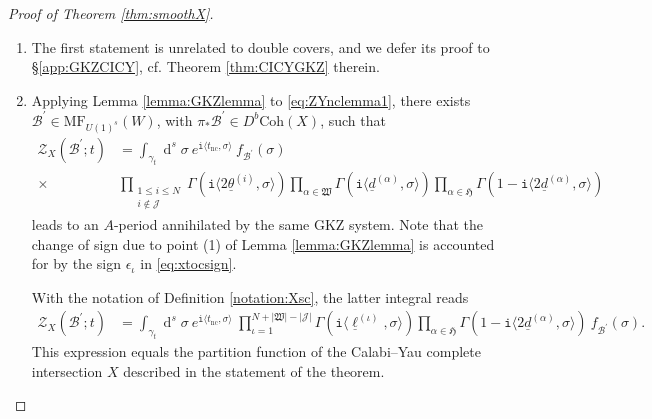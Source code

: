 \documentclass[12pt,a4paper,oneside]{amsart}
\numberwithin{equation}{section}
\theoremstyle{definition}
\theoremstyle{remark}
\DeclareMathOperator{\dd}{d}
\newcommand{\mz}{\mathcal{Z}}
\newcommand{\Br}{\mathcal{B}}
\newcommand{\MF}{\mathrm{MF}}
\newcommand{\ii}{\mathtt{i}}
\newcommand{\tnc}{t_{\mathrm{nc}}}
\begin{document}
\begin{proof}[Proof of Theorem \ref{thm:smoothX}] 
\begin{enumerate}[(1)]
    \item The first statement is unrelated to double covers, and we defer its proof to \S\ref{app:GKZCICY}, cf. Theorem \ref{thm:CICYGKZ} therein.
    \item Applying Lemma \ref{lemma:GKZlemma} to \eqref{eq:ZYnclemma1}, there exists $\Br^{\prime} \in \MF_{U(1)^s} (W)$, with $\pi_{\ast} \Br^{\prime}  \in D^b \mathrm{Coh} (X)$, such that 
\begin{equation*}
\begin{aligned}
	\mz_{X} \left( \Br^{\prime}; t \right) &= \int_{\gamma_t} \dd^s \sigma~ e^{\ii \langle \tnc , \sigma\rangle } ~f_{\Br^{\prime}} \left( \sigma \right) \\
		\times & \prod_{\substack{ 1 \le i \le N \\ i \notin \mathcal{J} }} \Gamma \left( \ii \langle 2 \underline{\theta}^{(i)}, \sigma \rangle \right) \prod_{\alpha \in \mathfrak{W}} \Gamma \left( \ii \langle \underline{d}^{(\alpha)}, \sigma \rangle \right) \prod_{\alpha\in \mathfrak{H} } \Gamma \left( 1 - \ii \langle  2 \underline{d}^{(\alpha)}, \sigma \rangle \right) 
\end{aligned}
\end{equation*}
leads to an $A$-period annihilated by the same GKZ system. Note that the change of sign due to point (1) of Lemma \ref{lemma:GKZlemma} is accounted for by the sign $\epsilon_{\iota}$ in \eqref{eq:xtocsign}.\par
With the notation of Definition \ref{notation:Xsc}, the latter integral reads
\begin{equation*}
\begin{aligned}
	\mz_{X} \left( \Br^{\prime}; t \right) &= \int_{\gamma_t} \dd^s \sigma~ e^{\ii \langle \tnc , \sigma\rangle } ~\prod_{\iota =1}^{N + \lvert \mathfrak{W} \rvert - \lvert \mathcal{J} \rvert} \Gamma \left( \ii \langle \underline{\ell}^{(\iota)}, \sigma \rangle \right)  \prod_{\alpha\in \mathfrak{H} } \Gamma \left( 1 - \ii \langle 2\underline{d}^{(\alpha)}, \sigma \rangle \right)  ~f_{\Br^{\prime}} \left( \sigma \right) .
\end{aligned}
\end{equation*}
This expression equals the partition function of the Calabi--Yau complete intersection $X$ described in the statement of the theorem.
\end{enumerate}
\end{proof}
\end{document}
